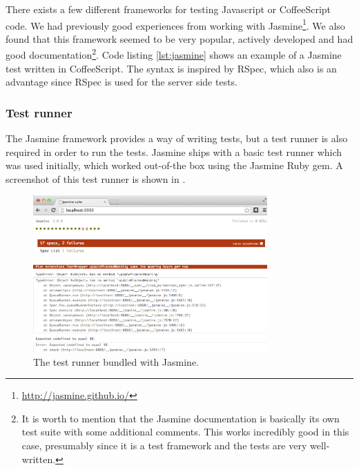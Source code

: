 
There exists a few different frameworks for testing Javascript or
CoffeeScript code. We had previously good experiences from working with
Jasmine\footnote{\url{http://jasmine.github.io/}}. We also found that
this framework seemed to be very popular, actively developed and had
good documentation\footnote{It is worth to mention that the Jasmine
documentation is basically its own test suite with some additional
comments. This works incredibly good in this case, presumably since it
is a test framework and the tests are very well-written.}. Code listing
\ref{lst:jasmine} shows an example of a Jasmine test written in
CoffeeScript. The syntax is inspired by RSpec, which also is an
advantage since RSpec is used for the server side tests.\\

\subsubsection{Test runner}
The Jasmine framework provides a way of writing tests, but a test runner
is also required in order to run the tests. Jasmine ships with a basic
test runner which was used initially, which worked out-of-the box using
the Jasmine Ruby gem. A screenshot of this test runner is shown in
.\\

\begin{figure}
\centering
\includegraphics[width=0.8\textwidth]{results/choices/jasmine_runner}
\caption{The test runner bundled with Jasmine.}
\label{fig:jasmine_runner}
\end{figure}

